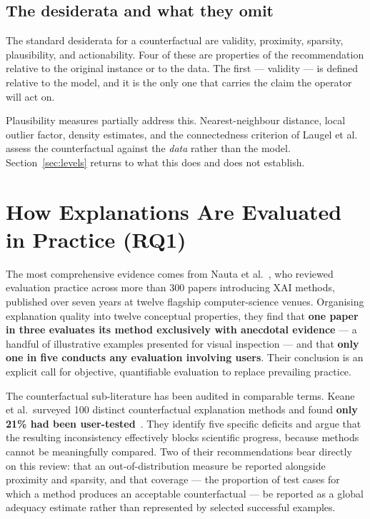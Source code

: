 \documentclass[11pt,a4paper]{article}
\begin{document}
\subsection{The desiderata and what they omit}

The standard desiderata for a counterfactual are validity, proximity, sparsity, plausibility, and actionability. Four of these are properties of the recommendation relative to the original instance or to the data. The first --- validity --- is defined relative to the model, and it is the only one that carries the claim the operator will act on.

Plausibility measures partially address this. Nearest-neighbour distance, local outlier factor, density estimates, and the connectedness criterion of Laugel et al.~\cite{laugel2019} assess the counterfactual against the \emph{data} rather than the model. Section~\ref{sec:levels} returns to what this does and does not establish.

\section{How Explanations Are Evaluated in Practice (RQ1)}\label{sec:practice}

The most comprehensive evidence comes from Nauta et al.~\cite{nauta2023}, who reviewed evaluation practice across more than 300 papers introducing XAI methods, published over seven years at twelve flagship computer-science venues. Organising explanation quality into twelve conceptual properties, they find that \textbf{one paper in three evaluates its method exclusively with anecdotal evidence} --- a handful of illustrative examples presented for visual inspection --- and that \textbf{only one in five conducts any evaluation involving users}. Their conclusion is an explicit call for objective, quantifiable evaluation to replace prevailing practice.

The counterfactual sub-literature has been audited in comparable terms. Keane et al.\ surveyed 100 distinct counterfactual explanation methods and found \textbf{only 21\% had been user-tested}~\cite{keane2021}. They identify five specific deficits and argue that the resulting inconsistency effectively blocks scientific progress, because methods cannot be meaningfully compared. Two of their recommendations bear directly on this review: that an out-of-distribution measure be reported alongside proximity and sparsity, and that coverage --- the proportion of test cases for which a method produces an acceptable counterfactual --- be reported as a global adequacy estimate rather than represented by selected successful examples.
\end{document}
